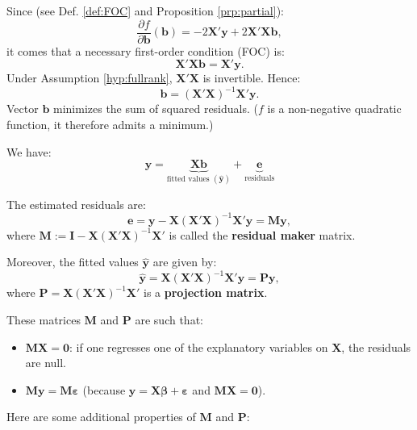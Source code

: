 \documentclass[
  12pt,
]{book}
\providecommand{\tightlist}{%
  \setlength{\itemsep}{0pt}\setlength{\parskip}{0pt}}
\theoremstyle{definition}
\theoremstyle{definition}
\theoremstyle{definition}
\theoremstyle{definition}
\theoremstyle{remark}
\begin{document}
Since (see Def. \ref{def:FOC} and Proposition \ref{prp:partial}):
\[
\frac{\partial f}{\partial \mathbf{b}}(\mathbf{b}) = - 2 \mathbf{X}'\mathbf{y} + 2 \mathbf{X}'\mathbf{X}\mathbf{b},
\]
it comes that a necessary first-order condition (FOC) is:
\begin{equation}
\mathbf{X}'\mathbf{X}\mathbf{b} = \mathbf{X}'\mathbf{y}.\label{eq:OLSFOC}
\end{equation}
Under Assumption \ref{hyp:fullrank}, \(\mathbf{X}'\mathbf{X}\) is invertible. Hence:
\[
\boxed{\mathbf{b} = (\mathbf{X}'\mathbf{X})^{-1} \mathbf{X}'\mathbf{y}.}
\]
Vector \(\mathbf{b}\) minimizes the sum of squared residuals. (\(f\) is a non-negative quadratic function, it therefore admits a minimum.)

We have:
\[
\mathbf{y} = \underbrace{\mathbf{X}\mathbf{b}}_{\mbox{fitted values } (\hat{\mathbf{y}})} + \underbrace{\mathbf{e}}_{\mbox{residuals}}
\]

The estimated residuals are:
\begin{equation}
\mathbf{e} = \mathbf{y} - \mathbf{X} (\mathbf{X}'\mathbf{X})^{-1} \mathbf{X}' \mathbf{y} = \mathbf{M} \mathbf{y},\label{eq:Mres}
\end{equation}
where \(\mathbf{M} := \mathbf{I} - \mathbf{X} (\mathbf{X}'\mathbf{X})^{-1} \mathbf{X}'\) is called the \textbf{residual maker} matrix.

Moreover, the fitted values \(\hat{\mathbf{y}}\) are given by:
\begin{equation}
\hat{\mathbf{y}}=\mathbf{X} (\mathbf{X}'\mathbf{X})^{-1} \mathbf{X}' \mathbf{y} = \mathbf{P} \mathbf{y},\label{eq:Proj}
\end{equation}
where \(\mathbf{P}=\mathbf{X} (\mathbf{X}'\mathbf{X})^{-1} \mathbf{X}'\) is a \textbf{projection matrix}.

These matrices \(\mathbf{M}\) and \(\mathbf{P}\) are such that:

\begin{itemize}
\tightlist
\item
  \(\mathbf{M} \mathbf{X} = \mathbf{0}\): if one regresses one of the explanatory variables on \(\mathbf{X}\), the residuals are null.
\item
  \(\mathbf{M}\mathbf{y}=\mathbf{M}\boldsymbol\varepsilon\) (because \(\mathbf{y} = \mathbf{X}\boldsymbol\beta + \boldsymbol\varepsilon\) and \(\mathbf{M} \mathbf{X} = \mathbf{0}\)).
\end{itemize}

Here are some additional properties of \(\mathbf{M}\) and \(\mathbf{P}\):
\end{document}
